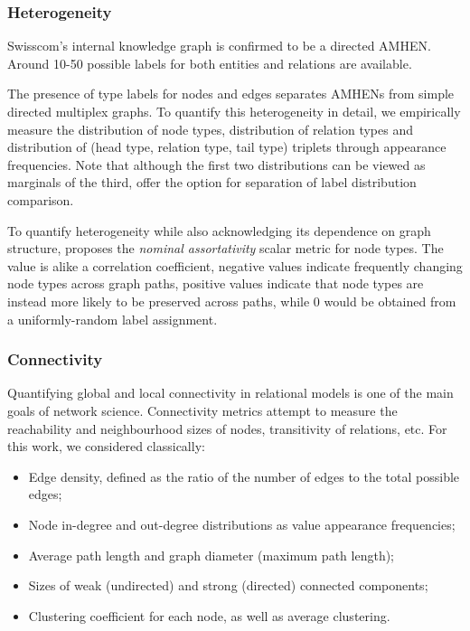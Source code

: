 \subsubsection{Heterogeneity}

Swisscom's internal knowledge graph is confirmed to be a directed AMHEN. Around 10-50 possible labels for both entities and relations are available. 
 
The presence of type labels for nodes and edges separates AMHENs from simple directed multiplex graphs. To quantify this heterogeneity in detail, we empirically measure the distribution of node types, distribution of relation types and distribution of (head type, relation type, tail type) triplets through appearance frequencies. Note that although the first two distributions can be viewed as marginals of the third, offer the option for separation of label distribution comparison. 

To quantify heterogeneity while also acknowledging its dependence on graph structure, \cite{newman_mixing_2003} proposes the \emph{nominal assortativity} scalar metric for node types. The value is alike a correlation coefficient, negative values indicate frequently changing node types across graph paths, positive values indicate that node types are instead more likely to be preserved across paths, while 0 would be obtained from a uniformly-random label assignment.

\subsubsection{Connectivity}

Quantifying global and local connectivity in relational models is one of the main goals of network science. Connectivity metrics attempt to measure the reachability and neighbourhood sizes of nodes, transitivity of relations, etc. For this work, we considered classically:
\begin{itemize}
    \item Edge density, defined as the ratio of the number of edges to the total possible edges;
    \item Node in-degree and out-degree distributions as value appearance frequencies;
    \item Average path length and graph diameter (maximum path length);
    \item Sizes of weak (undirected) and strong (directed) connected components;
    \item Clustering coefficient for each node, as well as average clustering.
\end{itemize}

